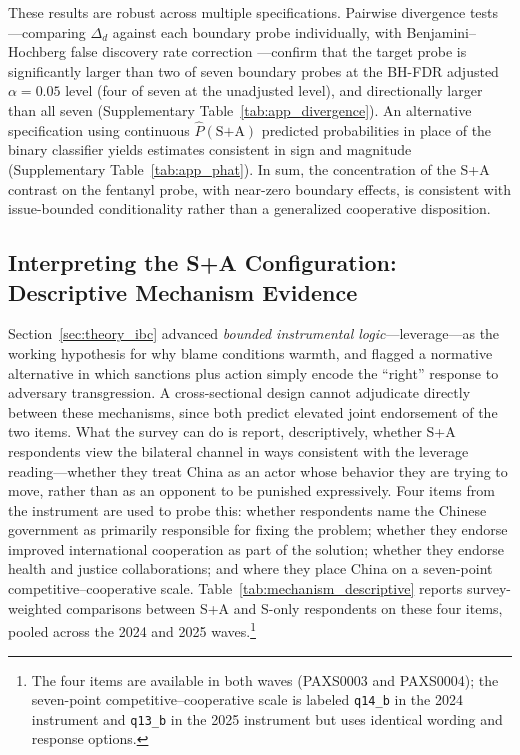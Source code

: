 \documentclass[12pt,letterpaper]{article}
\begin{document}
These results are robust across multiple specifications. Pairwise divergence tests---comparing $\Delta_d$ against each boundary probe individually, with Benjamini--Hochberg false discovery rate correction \citep{benjamini_controlling_1995}---confirm that the target probe is significantly larger than two of seven boundary probes at the BH-FDR adjusted $\alpha = 0.05$ level (four of seven at the unadjusted level), and directionally larger than all seven (Supplementary Table~\ref{tab:app_divergence}). An alternative specification using continuous $\hat{P}(\text{S+A})$ predicted probabilities in place of the binary classifier yields estimates consistent in sign and magnitude (Supplementary Table~\ref{tab:app_phat}). In sum, the concentration of the S+A contrast on the fentanyl probe, with near-zero boundary effects, is consistent with issue-bounded conditionality rather than a generalized cooperative disposition.

\subsection{Interpreting the S+A Configuration: Descriptive Mechanism Evidence}
\label{sec:results_mechanism}

Section~\ref{sec:theory_ibc} advanced \emph{bounded instrumental logic}---leverage---as the working hypothesis for why blame conditions warmth, and flagged a normative alternative in which sanctions plus action simply encode the ``right'' response to adversary transgression. A cross-sectional design cannot adjudicate directly between these mechanisms, since both predict elevated joint endorsement of the two items. What the survey can do is report, descriptively, whether S+A respondents view the bilateral channel in ways consistent with the leverage reading---whether they treat China as an actor whose behavior they are trying to move, rather than as an opponent to be punished expressively. Four items from the instrument are used to probe this: whether respondents name the Chinese government as primarily responsible for fixing the problem; whether they endorse improved international cooperation as part of the solution; whether they endorse health and justice collaborations; and where they place China on a seven-point competitive--cooperative scale. Table~\ref{tab:mechanism_descriptive} reports survey-weighted comparisons between S+A and S-only respondents on these four items, pooled across the 2024 and 2025 waves.\footnote{The four items are available in both waves (PAXS0003 and PAXS0004); the seven-point competitive--cooperative scale is labeled \texttt{q14\_b} in the 2024 instrument and \texttt{q13\_b} in the 2025 instrument but uses identical wording and response options.}
\end{document}
